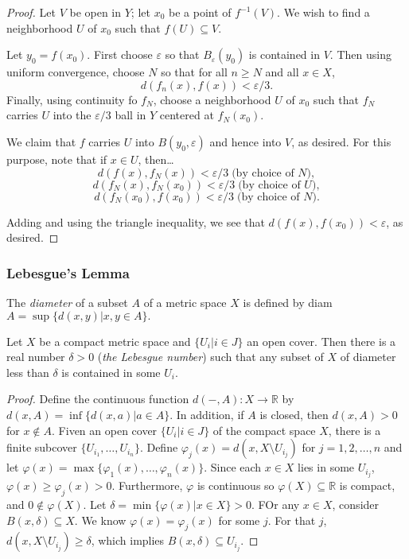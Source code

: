 \begin{proof}
Let $V$ be open in $Y$; let $x_0$ be a point of $f^{-1}(V).$ We wish to find a neighborhood $U$ of $x_0$ such that $f(U) \subseteq V$.

Let $y_0 = f(x_0)$. First choose $\varepsilon$ so that $B_{\varepsilon}(y_0)$ is contained in $V$. Then using uniform convergence,
choose $N$ so that for all $n \geq N$ and all $x \in X$,
$$d(f_n(x),f(x)) < \varepsilon / 3.$$
Finally, using continuity fo $f_N$, choose a neighborhood $U$ of $x_0$ such that $f_N$ carries $U$ into the $\varepsilon / 3$ ball
in $Y$ centered at $f_N(x_0)$.

We claim that $f$ carries $U$ into $B(y_0,\varepsilon)$ and hence into $V$, as desired. For this purpose, note that if $x \in U$, then\dots
$$d(f(x), f_N(x)) < \varepsilon/3 \; \textrm{(by choice of } N \textrm{)},$$
$$d(f_N(x), f_N(x_0)) < \varepsilon/3 \; \textrm{(by choice of } U \textrm{)},$$
$$d(f_N(x_0), f(x_0)) < \varepsilon/3 \; \textrm{(by choice of } N \textrm{)}.$$

Adding and using the triangle inequality, we see that $d(f(x),f(x_0)) < \varepsilon$, as desired.
\end{proof}

\subsubsection{Lebesgue's Lemma}

\label{diameter}
The \emph{diameter} of a subset $A$ of a metric space $X$ is defined by diam $A = \sup\{d(x,y) | x,y \in A \}.$

\begin{lemma}
\label{lebesguelemma}
Let $X$ be a compact metric space and $\{ U_i | i \in J \}$ an open cover. Then there is a real number
$\delta > 0$ (\emph{the Lebesgue number}\label{lebesguenumber}) such that any subset of $X$ of diameter less than $\delta$
is contained in some $U_i$.
\end{lemma}

\begin{proof}
Define the continuous function $d(-,A): X \rightarrow \mathbb{R}$ by $d(x, A) = \inf\{d(x,a) | a \in A \}$. In addition,
if $A$ is closed, then $d(x,A) > 0$ for $x \not \in A$. Fiven an open cover $\{ U_i | i \in J \}$ of the compact space $X$,
there is a finite subcover $\{U_{i_1},\dots, U_{i_n} \}$. Define $\varphi_j(x) = d(x,X \setminus U_{i_j})$ for $j = 1,2,\dots, n$
and let $\varphi(x) = \max\{\varphi_1(x), \dots, \varphi_n(x) \}$. Since each $x \in X$ lies in some $U_{i_j}$, $\varphi(x) \geq \varphi_j(x) > 0$.
Furthermore, $\varphi$ is continuous so $\varphi(X) \subseteq \mathbb{R}$ is compact, and $0 \not \in \varphi(X)$. Let $\delta = \min \{ \varphi(x) | x \in X \} > 0$.
FOr any $x \in X$, consider $B(x, \delta) \subseteq X$. We know $\varphi(x) = \varphi_j(x)$ for some $j$. For that $j$, $d(x,X \setminus U_{i_j}) \geq \delta$, which implies
$B(x, \delta) \subseteq U_{i_j}$.
\end{proof}